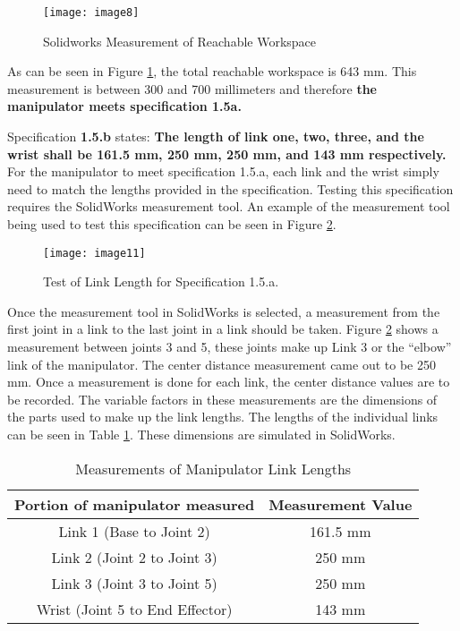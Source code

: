 \begin{figure}[htp]
  \centering
  \texttt{[image: image8]}
  \caption{Solidworks Measurement of Reachable Workspace}
  \label{fig:meas}
\end{figure}

As can be seen in Figure \ref{fig:meas}, the total reachable workspace is 643 mm. This measurement is between 300 and 700 millimeters and therefore \textbf{the manipulator meets specification 1.5a.}

Specification \textbf{1.5.b} states: \textbf{The length of link one, two, three, and the wrist shall be 161.5 mm, 250 mm, 250 mm, and 143 mm respectively.} For the manipulator to meet specification 1.5.a, each link and the wrist simply need to match the lengths provided in the specification. Testing this specification requires the SolidWorks measurement tool. An example of the measurement tool being used to test this specification can be seen in Figure \ref{fig:llength}.

\begin{figure}[htp]
  \centering
  \texttt{[image: image11]}
  \caption{Test of Link Length for Specification 1.5.a.}
  \label{fig:llength}
\end{figure}

Once the measurement tool in SolidWorks is selected, a measurement from the first joint in a link to the last joint in a link should be taken. Figure \ref{fig:llength} shows a measurement between joints 3 and 5, these joints make up Link 3 or the “elbow” link of the manipulator. The center distance measurement came out to be 250 mm. Once a measurement is done for each link, the center distance values are to be recorded. The variable factors in these measurements are the dimensions of the parts used to make up the link lengths. The lengths of the individual links can be seen in Table \ref{tab:linklengths}. These dimensions are simulated in SolidWorks.


\begin{table}[htp]
  \centering
  \caption{Measurements of Manipulator Link Lengths}
  \label{tab:linklengths}
  \begin{tabular}{c|c}
    Portion of manipulator measured & Measurement Value \\\hline
    Link 1 (Base to Joint 2) & 161.5 mm \\
    Link 2 (Joint 2 to Joint 3) & 250 mm \\
    Link 3 (Joint 3 to Joint 5) & 250 mm \\
    Wrist (Joint 5 to End Effector) & 143 mm \\
  \end{tabular}
\end{table}

